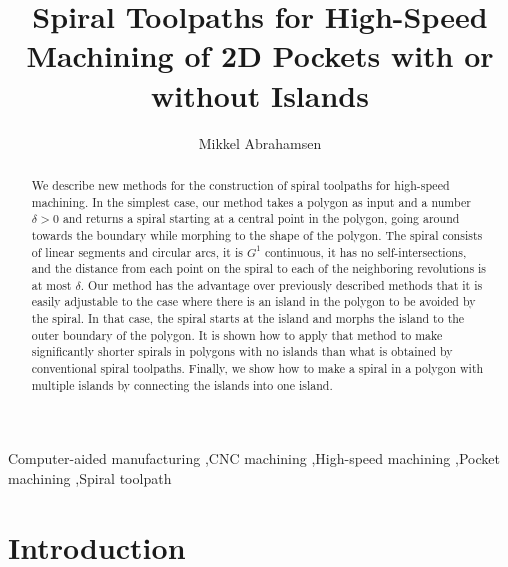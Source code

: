 \documentclass[3p]{elsarticle}
\newcommand{\stepover}{\delta}
\begin{document}
\begin{frontmatter}

\title{Spiral Toolpaths for High-Speed Machining of 2D Pockets with or without Islands}
\author{Mikkel Abrahamsen}
\address{Department of Computer Science\\
University of Copenhagen\\
Universitetsparken 5\\
DK-2100 K\o{}benhavn \O\\
Denmark\\
\texttt{miab@di.ku.dk}}

\begin{abstract}
We describe new methods for the construction of spiral toolpaths for high-speed machining.
In the simplest case, our method takes a polygon as input and a number $\stepover>0$ and
returns a spiral starting at a central point in the polygon, going around towards the boundary
while morphing to the shape of the polygon. The spiral consists of
linear segments and circular arcs, it is $G^1$ continuous, it has no self-intersections, and
the distance from each point on the spiral to each of the neighboring revolutions is at most $\stepover$.
Our method has the advantage over previously described methods that it is
easily adjustable to the case where there is an island in the polygon to be avoided by the spiral.
In that case, the spiral starts at the island and morphs
the island to the outer boundary of the polygon. It is shown how to apply that method to make
significantly shorter spirals in polygons with no islands than what is obtained by conventional
spiral toolpaths. Finally, we show how to make
a spiral in a polygon with multiple islands by connecting the islands into one island.
\end{abstract}

\begin{keyword}
Computer-aided manufacturing \sep CNC machining \sep High-speed machining
\sep Pocket machining \sep Spiral toolpath




\end{keyword}

\end{frontmatter}





\section{Introduction}
\end{document}
